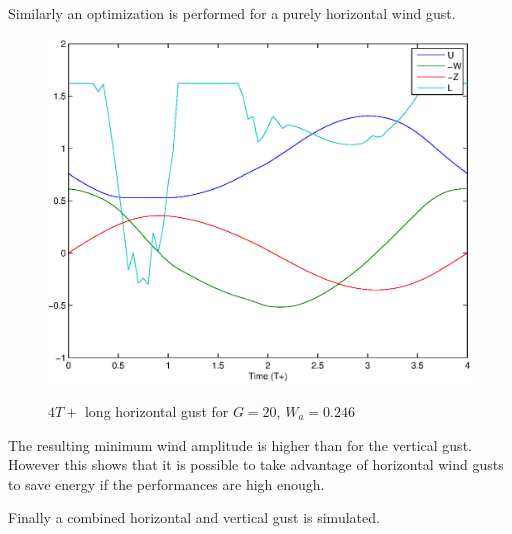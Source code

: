 \par Similarly an optimization is performed for a purely horizontal wind gust.

\begin{figure}[h]
	\begin{center}
		\scalebox{0.8}
		{\includegraphics{./Figures/Windtype=2_Tg=4_Wg=0p246_quad_G=20.eps}}
	\end{center}
	\caption{$4T+$ long horizontal gust for $G=20$, $W_a=0.246$}
	\label{fig:Horizontal_optimization}
\end{figure}

The resulting minimum wind amplitude is higher than for the vertical gust. 
However this shows that it is possible to take advantage of horizontal wind gusts to save energy if the performances are high enough.

\par Finally a combined horizontal and vertical gust is simulated.

